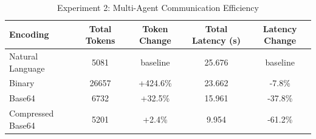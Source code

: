 \begin{table}[htbp]
\centering
\caption{Experiment 2: Multi-Agent Communication Efficiency}
\begin{tabular}{lcccc}
\toprule
Encoding & Total Tokens & Token Change & Total Latency (s) & Latency Change \\
\midrule
Natural Language & 5081 & baseline & 25.676 & baseline \\
Binary & 26657 & +424.6\% & 23.662 & -7.8\% \\
Base64 & 6732 & +32.5\% & 15.961 & -37.8\% \\
Compressed Base64 & 5201 & +2.4\% & 9.954 & -61.2\% \\
\bottomrule
\end{tabular}
\label{tab:exp2_results}
\end{table}
